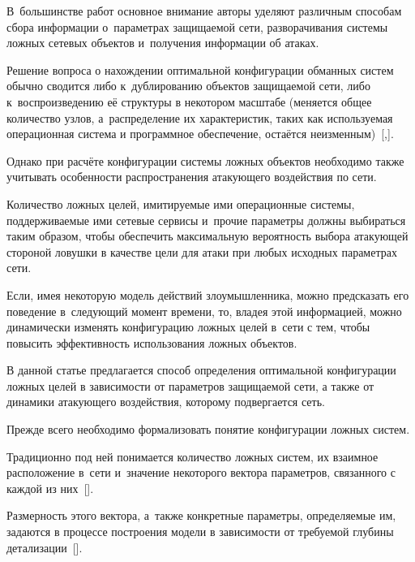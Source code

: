 В~большинстве работ основное внимание авторы уделяют различным способам сбора информации о~параметрах защищаемой сети, разворачивания системы ложных сетевых объектов и~получения информации об атаках.

Решение вопроса о нахождении оптимальной конфигурации обманных систем обычно сводится либо к~дублированию объектов защищаемой сети, либо к~воспроизведению её структуры в некотором масштабе (меняется общее количество узлов, а~распределение их характеристик, таких как используемая операционная система и программное обеспечение, остаётся неизменным)~[,].



Однако при расчёте конфигурации системы ложных объектов необходимо также учитывать особенности распространения атакующего воздействия по сети. 

Количество ложных целей, имитируемые ими операционные системы, поддерживаемые ими сетевые сервисы и~прочие параметры должны выбираться таким образом, чтобы обеспечить максимальную вероятность выбора атакующей стороной ловушки в качестве цели для атаки при любых исходных параметрах сети. 

Если, имея некоторую модель действий злоумышленника, можно предсказать его поведение в~следующий момент времени, то, владея этой информацией, можно динамически изменять конфигурацию ложных целей в~сети с тем, чтобы повысить эффективность использования ложных объектов.



В данной статье предлагается способ определения оптимальной конфигурации ложных целей в зависимости от параметров защищаемой сети, а также от динамики атакующего воздействия, которому подвергается сеть.





\smallskip




Прежде всего необходимо формализовать понятие конфигурации ложных систем. 

Традиционно под ней понимается количество ложных систем, их взаимное расположение в~сети и~значение некоторого вектора параметров, связанного с каждой из них~[]. 

Размерность этого вектора, а~также конкретные параметры, определяемые им, задаются в процессе построения модели в зависимости от требуемой глубины детализации~[]. 

